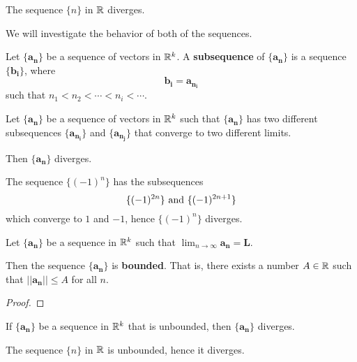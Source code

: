     \begin{example}
    The sequence $\{n\}$ in $\mathbb{R}$ diverges.
    \end{example}
    
    We will investigate the behavior of both of the sequences.


\begin{definition}
    Let $\{\bm{a_n}\}$ be a sequence of vectors in $\mathbb{R}^k$.  A \textbf{subsequence} of $\{\bm{a_n}\}$ is a sequence $\{\bm{b_i}\}$, where $$\bm{b_i} = \bm{a_{n_i}}$$
    such that $n_1 < n_2 < \cdots < n_i < \cdots$.
    \end{definition}

    
    \begin{theorem}
    Let $\{\bm{a_n}\}$ be a sequence of vectors in $\mathbb{R}^k$ such that $\{\bm{a_n}\}$ has two different subsequences $\{\bm{a_{n_i}}\}$ and $\{\bm{a_{n_j}}\}$ that converge to two different limits.
    
    Then  $\{\bm{a_n}\}$ diverges.
    \end{theorem}
    
    
     \begin{example}
    The sequence $\{(-1)^n\}$ has the subsequences $$\{(-1)^{2n}\} \textnormal{ and } \{(-1)^{2n+1}\}$$ which converge to $1$ and $-1$, hence $\{(-1)^n\}$ diverges.
    \end{example}

\begin{theorem}

Let $\{\bm{a_n}\}$ be a sequence in $\mathbb{R}^k$ such that $\lim_{n \to \infty}\bm{a_n} = \bm{L}$.

\vspace{1em}

Then the sequence $\{\bm{a_n}\}$ is \textbf{bounded}.  That is, there exists a number $A \in \mathbb{R}$ such that $||\bm{a_n}|| \leq A$ for all $n$.
\end{theorem}
    
    \begin{proof}
    \end{proof}
    
    
    \begin{corollary}
    If $\{\bm{a_n}\}$ be a sequence in $\mathbb{R}^k$ that is unbounded, then $\{\bm{a_n}\}$ diverges.
    \end{corollary}

\begin{example}
    The sequence $\{n\}$ in $\mathbb{R}$ is unbounded, hence it diverges.
    \end{example}




